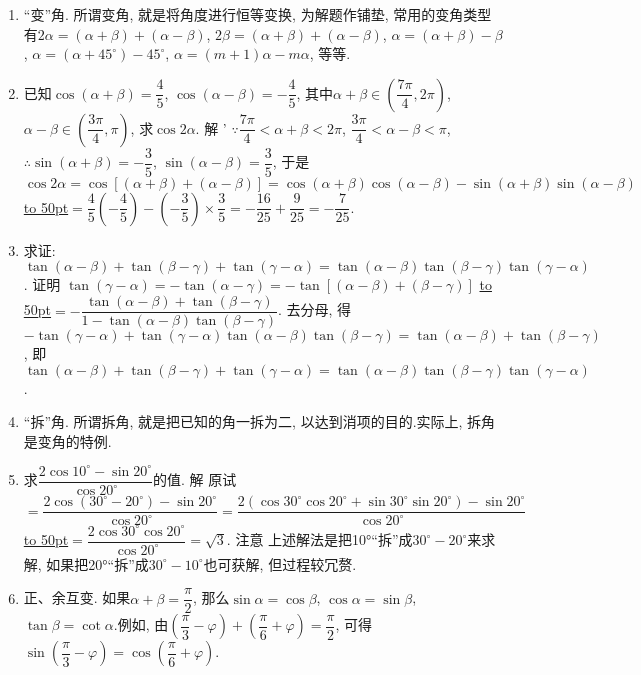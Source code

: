 \documentclass[10pt,a4paper]{article}
\newcommand{\blank}[1]{\underline{\hbox to #1pt{}}}
\begin{document}
\begin{enumerate}[1.]



\item ``变''角.
所谓变角, 就是将角度进行恒等变换, 为解题作铺垫, 常用的变角类型有$2\alpha =(\alpha +\beta)+(\alpha -\beta)$, $2\beta =(\alpha +\beta)+(\alpha -\beta)$, $\alpha =(\alpha +\beta)-\beta$, $\alpha =(\alpha +45^\circ)-45^\circ$, $\alpha =(m+1)\alpha -m\alpha$, 等等.
\item 已知$\cos (\alpha +\beta)=\dfrac 45$, $\cos (\alpha -\beta)=-\dfrac 45$, 其中$\alpha +\beta \in (\dfrac{7\pi}4,2\pi)$, $\alpha -\beta \in (\dfrac{3\pi}4,\pi)$, 求$\cos 2\alpha$.
解  ' $\because \dfrac{7\pi}4<\alpha +\beta <2\pi$, $\dfrac{3\pi}4<\alpha -\beta <\pi$, $\therefore \sin (\alpha +\beta)=-\dfrac 35$, $\sin (\alpha -\beta)=\dfrac 35$,
于是$\cos 2\alpha =\cos [(\alpha +\beta)+(\alpha -\beta)]=\cos (\alpha +\beta)\cos (\alpha -\beta)-\sin (\alpha +\beta)\sin (\alpha -\beta)$
\blank{50}$=\dfrac 45(-\dfrac 45)-(-\dfrac 35)\times \dfrac 35=-\dfrac{16}{25}+\dfrac 9{25}=-\dfrac 7{25}$.
\item 求证: $\tan (\alpha -\beta)+\tan (\beta -\gamma)+\tan (\gamma -\alpha)=\tan (\alpha -\beta)\tan (\beta -\gamma)\tan (\gamma -\alpha)$.
证明  $\tan (\gamma -\alpha)=-\tan (\alpha -\gamma)=-\tan [(\alpha -\beta)+(\beta -\gamma)]$
\blank{50}$=-\dfrac{\tan (\alpha -\beta)+\tan (\beta -\gamma)}{1-\tan (\alpha -\beta)\tan (\beta -\gamma)}$.
去分母, 得$-\tan (\gamma -\alpha)+\tan (\gamma -\alpha)\tan (\alpha -\beta)\tan (\beta -\gamma)=\tan (\alpha -\beta)+\tan (\beta -\gamma)$,
即$\tan (\alpha -\beta)+\tan (\beta -\gamma)+\tan (\gamma -\alpha)=\tan (\alpha -\beta)\tan (\beta -\gamma)\tan (\gamma -\alpha)$.
\item ``拆''角.
所谓拆角, 就是把已知的角一拆为二, 以达到消项的目的.实际上, 拆角是变角的特例.
\item 求$\dfrac{2\cos 10^\circ -\sin 20^\circ}{\cos 20^\circ}$的值.
解  原试$=\dfrac{2\cos (30^\circ -20^\circ)-\sin 20^\circ}{\cos 20^\circ}=\dfrac{2(\cos 30^\circ \cos 20^\circ +\sin 30^\circ \sin 20^\circ)-\sin 20^\circ}{\cos 20^\circ}$
\blank{50}$=\dfrac{2\cos 30^\circ \cos 20^\circ}{\cos 20^\circ}=\sqrt 3$.
注意  上述解法是把10°``拆''成$30^\circ -20^\circ$来求解, 如果把20°``拆''成$30^\circ -10^\circ$也可获解, 但过程较冗赘.
\item 正、余互变.
如果$\alpha +\beta =\dfrac{\pi}2$, 那么$\sin \alpha =\cos \beta$, $\cos \alpha =\sin \beta$, $\tan \beta =\cot \alpha$.例如, 由$(\dfrac{\pi}3-\varphi)+(\dfrac{\pi}6+\varphi)=\dfrac{\pi}2$, 可得$\sin (\dfrac{\pi}3-\varphi)=\cos (\dfrac{\pi}6+\varphi)$.

\end{enumerate}
\end{document}
